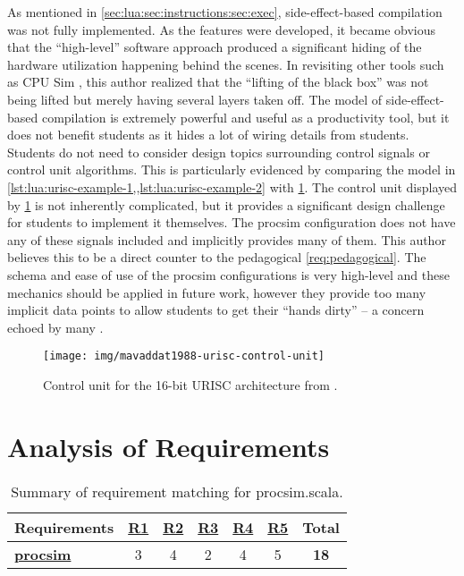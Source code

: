 As mentioned in \cref{sec:lua:sec:instructions:sec:exec}, side-effect-based compilation was not fully implemented. As the features were developed, it became obvious that the ``high-level'' software approach produced a significant hiding of the hardware utilization happening behind the scenes. In revisiting other tools such as CPU Sim \cite{Skrien2001}, this author realized that the ``lifting of the black box'' was not being lifted but merely having several layers taken off. The model of side-effect-based compilation is extremely powerful and useful as a productivity tool, but it does not benefit students as it hides a lot of wiring details from students. Students do not need to consider design topics surrounding control signals or control unit algorithms. This is particularly evidenced by comparing the model in \cref{lst:lua:urisc-example-1,,lst:lua:urisc-example-2} with \cref{fig:mavaddat1988-urisc-control-unit}. The control unit displayed by \cref{fig:mavaddat1988-urisc-control-unit} is not inherently complicated, but it provides a significant design challenge for students to implement it themselves. The procsim configuration does not have any of these signals included and implicitly provides many of them. This author believes this to be a direct counter to the pedagogical \cref{req:pedagogical}. The schema and ease of use of the procsim configurations is very high-level and these mechanics should be applied in future work, however they provide too many implicit data points to allow students to get their ``hands dirty'' -- a concern echoed by many \cite{Skrien2001,Garcia2009,Ackovska2014,Black2013}.

\begin{figure}[hb!]
    \centering
    \texttt{[image: img/mavaddat1988-urisc-control-unit]}
    \caption{Control unit for the 16-bit URISC architecture from \cite[p.~331]{Mavaddat1988}.}
    \label{fig:mavaddat1988-urisc-control-unit}
\end{figure}

\section{Analysis of Requirements}


\begin{table}[h!]
    \centering
    \begin{tabular}{l|cccccc}
        \textbf{Requirements} & \textbf{\hyperref[req:personal]{R1}} & \textbf{\hyperref[req:configuration]{R2}} & \textbf{\hyperref[req:pedagogical]{R3}} & \textbf{\hyperref[req:simulations]{R4}} & \textbf{\hyperref[req:modern]{R5}} & \textbf{Total} \\ \hline
        \textbf{\hyperref[ch:lua-config]{procsim}} & 
        3 & 4 & 2 & 4 & 5 & \textbf{18} \\
    \end{tabular}
    \caption{Summary of requirement matching for procsim.scala.}
\end{table}

\clearpage